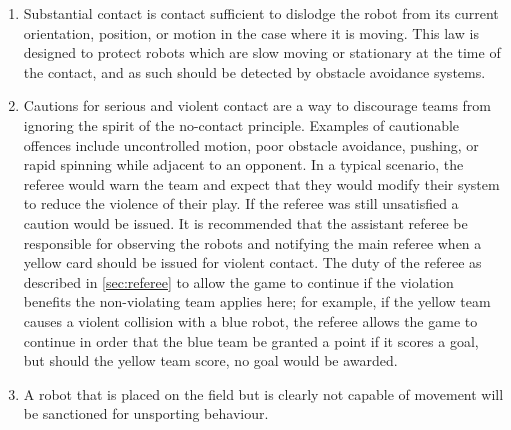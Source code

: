 \begin{enumerate}
\item
Substantial contact is contact sufficient to dislodge the robot from its current orientation, position, or motion in the case where it is moving. 
This law is designed to protect robots which are slow moving or stationary at the time of the contact, and as such should be detected by obstacle avoidance systems.

\item
Cautions for serious and violent contact are a way to discourage teams from ignoring the spirit of the no-contact principle.
Examples of cautionable offences include uncontrolled motion, poor obstacle avoidance, pushing, or rapid spinning while adjacent to an opponent.
In a typical scenario, the referee would warn the team and expect that they would modify their system to reduce the violence of their play.
If the referee was still unsatisfied a caution would be issued.
It is recommended that the assistant referee be responsible for observing the robots and notifying the main referee when a yellow card should be issued for violent contact.
The duty of the referee as described in \autoref{sec:referee} to allow the game to continue if the violation benefits the non-violating team applies here; for example, if the yellow team causes a violent collision with a blue robot, the referee allows the game to continue in order that the blue team be granted a point if it scores a goal, but should the yellow team score, no goal would be awarded.


\item
A robot that is placed on the field but is clearly not capable of movement will be sanctioned for unsporting behaviour.


\end{enumerate}
